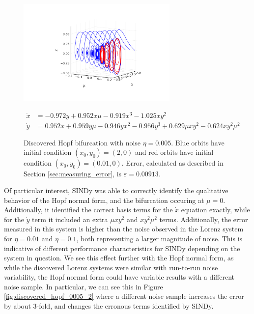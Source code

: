 \documentclass[10pt]{paper}
\begin{document}
\begin{figure}[h]
	\caption{Discovered Hopf bifurcation with noise $\eta = 0.005$. Blue orbits have initial condition $(x_0, y_0) = (2,0)$ and red orbits have initial condition $(x_0, y_0) = (0.01, 0)$. Error, calculated as described in Section \ref{sec:measuring_error}, is $\varepsilon = 0.00913$.}
	\label{fig:discovered_hopf_0005}

	\centering 

	\includegraphics[width = 0.7\textwidth, trim={4.3cm, 2cm, 4.2cm, 3cm}, clip]{found_hopf_bifurcation_0005.pdf}

	\[ \begin{aligned}
		\dot x &= -0.972y + 0.952x\mu -0.919x^3 -1.025xy^2 \\
		\dot y &= 0.952x + 0.959y\mu -0.946y x^2 -0.956y^3 + 0.629\mu x y^2 -0.624xy^2\mu^2
	\end{aligned} \]

\end{figure}

Of particular interest, SINDy was able to correctly identify the qualitative behavior of the Hopf normal form, and the bifurcation occuring at $\mu = 0$. Additionally, it identified the correct basis terms for the $\dot x$ equation exactly, while for the $\dot y$ term it included an extra $\mu xy^2$ and $xy^2\mu^2$ terms. 
Additionally, the error measured in this system is higher than the noise observed in the Lorenz system for $\eta = 0.01$ and $\eta = 0.1$, both representing a larger magnitude of noise. This is indicative of different performance characteristics for SINDy depending on the system in question. We see this effect further with the Hopf normal form, as while the discovered Lorenz systems were similar with run-to-run noise variability, the Hopf normal form could have variable results with a different noise sample. 
In particular, we can see this in Figure \ref{fig:discovered_hopf_0005_2} where a different noise sample increases the error by about 3-fold, and changes the erronous terms identified by SINDy. 
\end{document}
